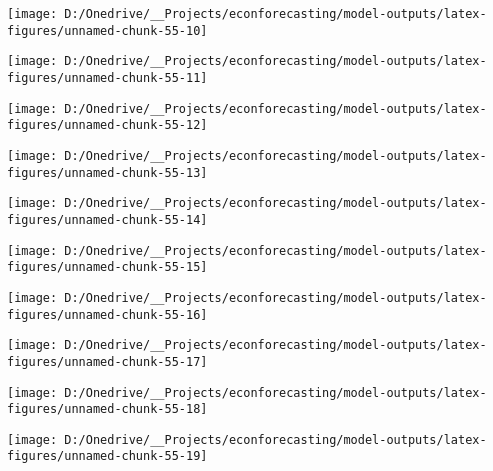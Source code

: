\documentclass[11pt, letterpaper]{article}\usepackage[]{graphicx}\usepackage[]{color}
\begin{document}
{\centering \texttt{[image: D:/Onedrive/\_\_Projects/econforecasting/model-outputs/latex-figures/unnamed-chunk-55-10]} 

}




{\centering \texttt{[image: D:/Onedrive/\_\_Projects/econforecasting/model-outputs/latex-figures/unnamed-chunk-55-11]} 

}




{\centering \texttt{[image: D:/Onedrive/\_\_Projects/econforecasting/model-outputs/latex-figures/unnamed-chunk-55-12]} 

}




{\centering \texttt{[image: D:/Onedrive/\_\_Projects/econforecasting/model-outputs/latex-figures/unnamed-chunk-55-13]} 

}




{\centering \texttt{[image: D:/Onedrive/\_\_Projects/econforecasting/model-outputs/latex-figures/unnamed-chunk-55-14]} 

}




{\centering \texttt{[image: D:/Onedrive/\_\_Projects/econforecasting/model-outputs/latex-figures/unnamed-chunk-55-15]} 

}




{\centering \texttt{[image: D:/Onedrive/\_\_Projects/econforecasting/model-outputs/latex-figures/unnamed-chunk-55-16]} 

}




{\centering \texttt{[image: D:/Onedrive/\_\_Projects/econforecasting/model-outputs/latex-figures/unnamed-chunk-55-17]} 

}




{\centering \texttt{[image: D:/Onedrive/\_\_Projects/econforecasting/model-outputs/latex-figures/unnamed-chunk-55-18]} 

}




{\centering \texttt{[image: D:/Onedrive/\_\_Projects/econforecasting/model-outputs/latex-figures/unnamed-chunk-55-19]} 

}
\end{document}
